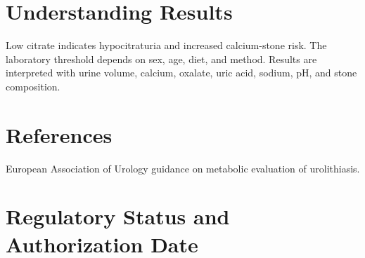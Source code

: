 \section*{Understanding Results}
Low citrate indicates hypocitraturia and increased calcium-stone risk. The laboratory threshold depends on sex, age, diet, and method. Results are interpreted with urine volume, calcium, oxalate, uric acid, sodium, pH, and stone composition.

\section*{References}
European Association of Urology guidance on metabolic evaluation of urolithiasis.

\clearpage


\section*{Regulatory Status and Authorization Date}

\clearpage
